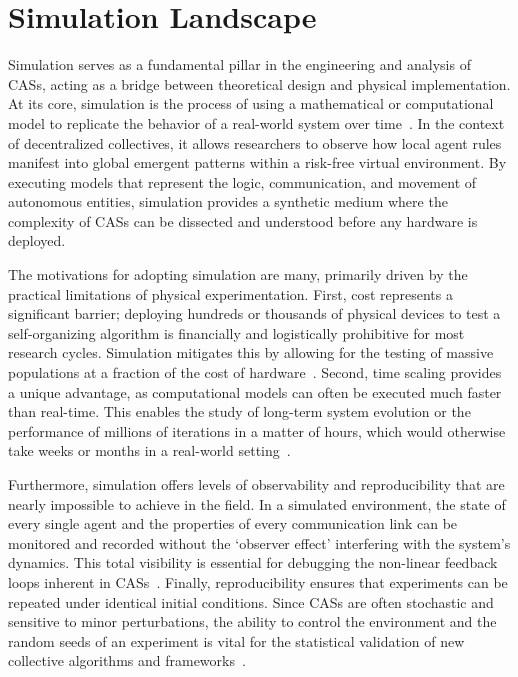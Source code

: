 \section{Simulation Landscape}
Simulation serves as a fundamental pillar in the engineering and analysis of \acp{CAS}, acting as a bridge between theoretical design and physical implementation. At its core, simulation is the process of using a mathematical or computational model to replicate the behavior of a real-world system over time~\cite{banks2005discrete}. In the context of decentralized collectives, it allows researchers to observe how local agent rules manifest into global emergent patterns within a risk-free virtual environment. By executing models that represent the logic, communication, and movement of autonomous entities, simulation provides a synthetic medium where the complexity of \acp{CAS} can be dissected and understood before any hardware is deployed.

The motivations for adopting simulation are many, primarily driven by the practical limitations of physical experimentation. First, cost represents a significant barrier; deploying hundreds or thousands of physical devices to test a self-organizing algorithm is financially and logistically prohibitive for most research cycles. Simulation mitigates this by allowing for the testing of massive populations at a fraction of the cost of hardware~\cite{DBLP:journals/isci/Schut10}. Second, time scaling provides a unique advantage, as computational models can often be executed much faster than real-time. This enables the study of long-term system evolution or the performance of millions of iterations in a matter of hours, which would otherwise take weeks or months in a real-world setting~\cite{MittalRiscoMartin2017SimBasedCAS}.

Furthermore, simulation offers levels of observability and reproducibility that are nearly impossible to achieve in the field. In a simulated environment, the state of every single agent and the properties of every communication link can be monitored and recorded without the `observer effect' interfering with the system's dynamics. This total visibility is essential for debugging the non-linear feedback loops inherent in \acp{CAS}~\cite{DBLP:journals/jos/Sargent13}. Finally, reproducibility ensures that experiments can be repeated under identical initial conditions. Since \acp{CAS} are often stochastic and sensitive to minor perturbations, the ability to control the environment and the random seeds of an experiment is vital for the statistical validation of new collective algorithms and frameworks~\cite{DBLP:journals/csur/GomesTBLV18}.

